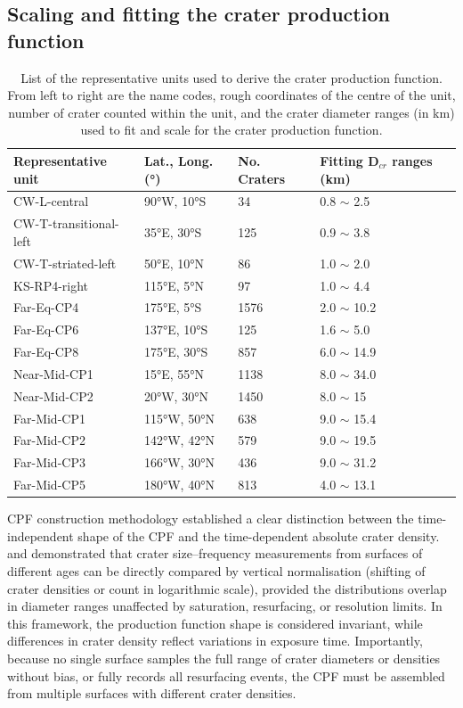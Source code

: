 \documentclass[preprint,11pt,3p,times,authoryear]{elsarticle}
\begin{document}
\subsection{Scaling and fitting the crater production function}
\begin{table}[t]
\centering
    \begin{tabular}{p{4.0cm} p{3.0cm} p{2.0cm} p{3.0cm}}
\hline
      \textbf{Representative unit} & \textbf{Lat., Long. (°)} & \textbf{No. Craters} & \textbf{Fitting D$_{cr}$ ranges (km) }\\
\hline
CW-L-central & 90°W, 10°S & 34 & 0.8 $\sim$ 2.5 \\
CW-T-transitional-left & 35°E, 30°S & 125 & 0.9 $\sim$ 3.8 \\
CW-T-striated-left & 50°E, 10°N & 86 & 1.0 $\sim$ 2.0 \\
KS-RP4-right & 115°E, 5°N & 97 & 1.0 $\sim$ 4.4 \\
Far-Eq-CP4 & 175°E, 5°S & 1576 & 2.0 $\sim$ 10.2\\
Far-Eq-CP6 & 137°E, 10°S & 125 & 1.6 $\sim$ 5.0 \\
Far-Eq-CP8 & 175°E, 30°S & 857 & 6.0 $\sim$ 14.9 \\
Near-Mid-CP1 & 15°E, 55°N & 1138 & 8.0 $\sim$ 34.0 \\
Near-Mid-CP2 & 20°W, 30°N & 1450 & 8.0 $\sim$ 15 \\
Far-Mid-CP1 & 115°W, 50°N & 638 & 9.0 $\sim$ 15.4 \\
Far-Mid-CP2 & 142°W, 42°N & 579 & 9.0 $\sim$ 19.5 \\
Far-Mid-CP3 & 166°W, 30°N & 436 & 9.0 $\sim$ 31.2 \\
Far-Mid-CP5 & 180°W, 40°N & 813 & 4.0 $\sim$ 13.1 \\
\hline
\end{tabular}
\caption{List of the representative units used to derive the crater production function. From left to right are the name codes, rough coordinates of the centre of the unit, number of crater counted within the unit, and the crater diameter ranges (in km) used to fit and scale for the crater production function.}
\label{tab:representative_units}
\end{table}

CPF construction methodology established a clear distinction between the time-independent shape of the CPF and the time-dependent absolute crater density. \citet{Neukum2001} and \citet{Ivanov2001} demonstrated that crater size–frequency measurements from surfaces of different ages can be directly compared by vertical normalisation (shifting of crater densities or count in logarithmic scale), provided the distributions overlap in diameter ranges unaffected by saturation, resurfacing, or resolution limits. In this framework, the production function shape is considered invariant, while differences in crater density reflect variations in exposure time. Importantly, because no single surface samples the full range of crater diameters or densities without bias, or fully records all resurfacing events, the CPF must be assembled from multiple surfaces with different crater densities.\\
\end{document}
